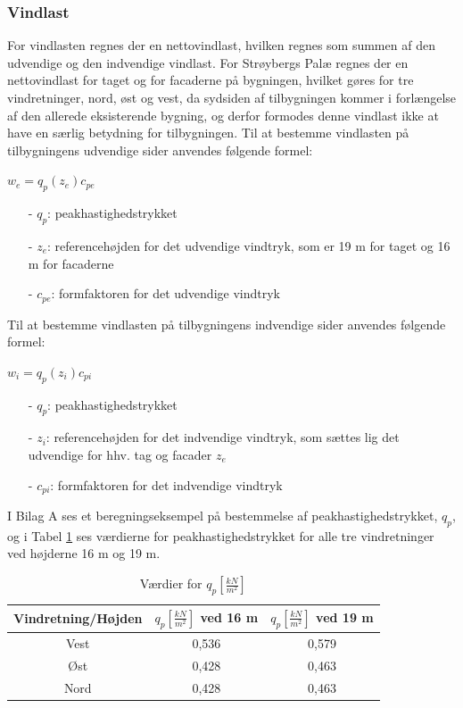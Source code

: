 \subsubsection{Vindlast}
For vindlasten regnes der en nettovindlast, hvilken regnes som summen af den udvendige og den indvendige vindlast.
\newline \indent{     }  For Strøybergs Palæ regnes der en nettovindlast for taget og for facaderne på bygningen, hvilket gøres for tre vindretninger, nord, øst og vest, da sydsiden af tilbygningen kommer i forlængelse af den allerede eksisterende bygning, og derfor formodes denne vindlast ikke at have en særlig betydning for tilbygningen.
\newline
\newline
Til at bestemme vindlasten på tilbygningens udvendige sider anvendes følgende formel:	
\begin{center} 
	$w_e=q_p(z_e)c_{pe}$
\end{center}
\begin{itemize}
	\item[-] $q_p$: peakhastighedstrykket
	\item[-] $z_e$: referencehøjden for det udvendige vindtryk, som er 19 m for taget og 16 m for facaderne
	\item[-] $c_{pe}$: formfaktoren for det udvendige vindtryk
\end{itemize}

Til at bestemme vindlasten på tilbygningens indvendige sider anvendes følgende formel:
\begin{center} 
	$w_i=q_p(z_i)c_{pi}$
\end{center}
\begin{itemize}
	\item[-] $q_p$: peakhastighedstrykket
	\item[-] $z_i$: referencehøjden for det indvendige vindtryk, som sættes lig det udvendige for hhv. tag og facader $z_e$ \citep[ kapitel 7.2.9]{EU91}
	\item[-] $c_{pi}$: formfaktoren for det indvendige vindtryk
\end{itemize}

I Bilag A ses et beregningseksempel på bestemmelse af peakhastighedstrykket, $q_p$, og i Tabel \ref{tab:peak} ses værdierne for peakhastighedstrykket for alle tre vindretninger ved højderne 16 m og 19 m.
\begin{table}[htb]
\begin{center}
	\begin{tabular}{ |c|c|c| } 
		\hline
		Vindretning/Højden & $q_p [\frac{kN}{m^2}]$ ved 16 m & $q_p [\frac{kN}{m^2}]$ ved 19 m \\	\hline
		Vest & 0,536 & 0,579 \\		\hline
		Øst & 0,428 & 0,463 \\	\hline 
		Nord & 0,428 & 0,463 \\ 	\hline
	\end{tabular}
		\caption{Værdier for $q_p [\frac{kN}{m^2}]$}
		\label{tab:peak}
\end{center}
\end{table}

